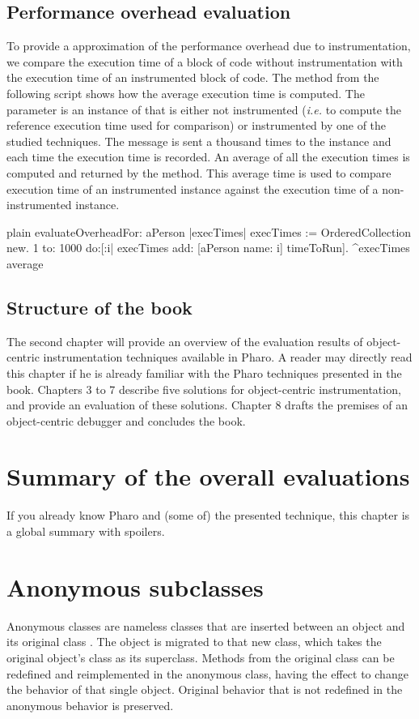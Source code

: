 \documentclass[10pt,twoside,english]{_support/latex/sbabook/sbabook}
\begin{document}
\section{Performance overhead evaluation}
To provide a approximation of the performance overhead due to instrumentation, we compare the execution time of a block of code without instrumentation with the execution time of an instrumented block of code. The method  from the following script shows how the average execution time is computed. The parameter is an instance of  that is either not instrumented (\textit{i.e.} to compute the reference execution time used for comparison) or instrumented by one of the studied techniques. The  message is sent a thousand times to the  instance and each time the execution time is recorded. An average of all the execution times is computed and returned by the method. This average time is used to compare execution time of an instrumented instance against the execution time of a non-instrumented instance.

\begin{displaycode}{plain}
evaluateOverheadFor: aPerson
  |execTimes|
  execTimes := OrderedCollection new.
  1 to: 1000 do:[:i|
    execTimes add: [aPerson name: i] timeToRun].
  ^execTimes average
\end{displaycode}
\section{Structure of the book}
The second chapter will provide an overview of the evaluation results of object-centric instrumentation techniques available in Pharo. A reader may directly read this chapter if he is already familiar with the Pharo techniques presented in the book. Chapters 3 to 7 describe five solutions for object-centric instrumentation, and provide an evaluation of these solutions. Chapter 8 drafts the premises of an object-centric debugger and concludes the book.

\chapter{Summary of the overall evaluations}
If you already know Pharo and (some of) the presented technique, this chapter is a global summary with spoilers.

\chapter{Anonymous subclasses}
Anonymous classes are nameless classes that are inserted between an object and its original class \cite{foote1989reflective,hinkle1993debugging}. The object is migrated to that new class, which takes the original object's class as its superclass. Methods from the original class can be redefined and reimplemented in the anonymous class, having the effect to change the behavior of that single object. Original behavior that is not redefined in the anonymous behavior is preserved.
\end{document}
